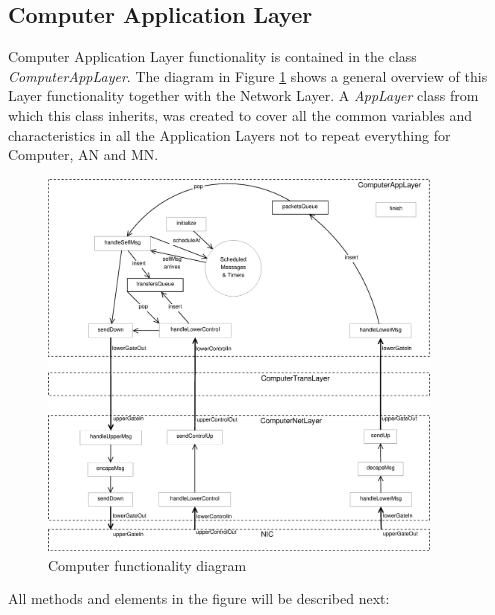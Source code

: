 \subsection{Computer Application Layer}

Computer Application Layer functionality is contained in the class \textit{ComputerAppLayer}. The diagram in Figure \ref{fig:Computerschema} 
shows a general overview of this Layer functionality together with the Network Layer. A \textit{AppLayer} class from which this class inherits,
was created to cover all the common variables and characteristics in all the Application Layers not to repeat everything for Computer, \ac{AN}
and \ac{MN}.

\begin{figure}[ht]
 \begin{center}
  \includegraphics[width=0.9\textwidth]{Computerschema.eps}
 \end{center}
 \caption{Computer functionality diagram}
 \label{fig:Computerschema}
\end{figure}

All methods and elements in the figure will be described next:

